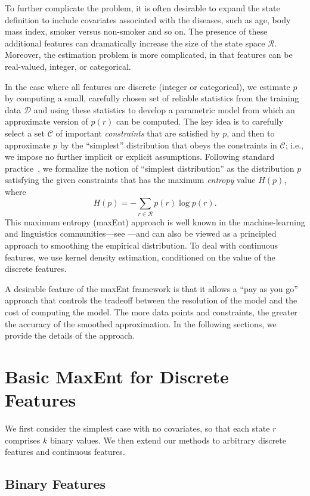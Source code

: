 \documentclass[11pt]{article}
\newcommand{\xC}{\mathcal{C}}
\newcommand{\xD}{\mathcal{D}}
\newcommand{\xR}{\mathcal{R}}
\begin{document}
To further complicate the problem, it is often desirable to expand the state definition to include covariates associated with the diseases, such as age, body mass index, smoker versus non-smoker and so on. The presence of these additional features can dramatically increase the size of the state space $\xR$. Moreover, the estimation problem is more complicated, in that features can be real-valued, integer, or categorical. 

In the case where all features are discrete (integer or categorical), we estimate $p$ by computing a small, carefully chosen set of reliable statistics from the training data $\xD$ and using these statistics to develop a parametric model from which an approximate version of $p(r)$ can be computed. The key idea is to carefully select a set $\xC$ of important \emph{constraints} that are satisfied by $p$, and then to approximate $p$ by the ``simplest'' distribution that obeys the constraints in $\xC$; i.e., we impose no further implicit or explicit assumptions. Following standard practice~\cite{jaynes82}, we formalize the notion of ``simplest distribution'' as the distribution $p$ satisfying the given constraints that has the maximum \emph{entropy} value $H(p)$, where
\[
H(p)=-\sum_{r\in\xR}p(r)\log p(r).
\]
This maximum entropy (maxEnt) approach is well known in the mach\-ine-learn\-ing and linguistics communities---see \cite{Malouf02}---and can also be viewed as a principled approach to smoothing the empirical distribution. To deal with continuous features, we use kernel density estimation, conditioned on the value of the discrete features.

A desirable feature of the maxEnt framework is that it allows a ``pay as you go'' approach that controls the tradeoff between the resolution of the model and the cost of computing the model. The more data points and constraints, the greater the accuracy of the smoothed approximation. In the following sections, we provide the details of the approach.

\section{Basic MaxEnt for Discrete Features}

We first consider the simplest case with no covariates, so that each state $r$ comprises $k$ binary values. We then extend our methods to arbitrary discrete features and continuous features.

\subsection{Binary Features}
\end{document}
